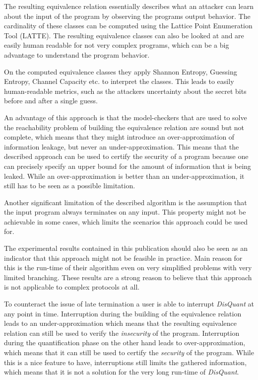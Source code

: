 \documentclass[a4paper,UKenglish]{lipics-v2018}
\begin{document}
The resulting equivalence relation essentially describes what an attacker can learn about the input of the program by observing the programs output behavior. The cardinality of these classes can be computed using the Lattice Point Enumeration Tool (LATTE). The resulting equivalence classes can also be looked at and are easily human readable for not very complex programs, which can be a big advantage to understand the program behavior.
\cite{automatic_discovery_and_quantification}

On the computed equivalence classes they apply Shannon Entropy, Guessing Entropy, Channel Capacity etc. to interpret the classes. This leads to easily human-readable metrics, such as the attackers uncertainty about the secret bits before and after a single guess.\cite{automatic_discovery_and_quantification}

An advantage of this approach is that the model-checkers that are used to solve the reachability problem of building the equivalence relation are sound but not complete, which means that they might introduce an over-approximation of information leakage, but never an under-approximation. This means that the described approach can be used to certify the security of a program because one can precisely specify an upper bound for the amount of information that is being leaked.\cite{automatic_discovery_and_quantification} While an over-approximation is better than an under-approximation, it still has to be seen as a possible limitation.

Another significant limitation of the described algorithm is the assumption that the input program always terminates on any input. This property might not be achievable in some cases, which limits the scenarios this approach could be used for.

The experimental results contained in this publication should also be seen as an indicator that this approach might not be feasible in practice. Main reason for this is the run-time of their algorithm  even on very simplified problems with very limited branching. These results are a strong reason to believe that this approach is not applicable to complex protocols at all.
\cite{automatic_discovery_and_quantification}

To counteract the issue of late termination a user is able to interrupt \textit{DisQuant} at any point in time. Interruption during the building of the equivalence relation leads to an under-approximation which means that the resulting equivalence relation can still be used to verify the \textit{insecurity} of the program. Interruption during the quantification phase on the other hand leads to over-approximation, which means that it can still be used to certify the \textit{security} of the program. While this is a nice feature to have, interruptions still limits the gathered information, which means that it is not a solution for the very long run-time of \textit{DisQuant}.
\cite{automatic_discovery_and_quantification}
\end{document}
